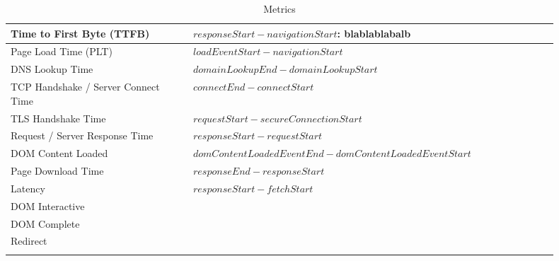 

\begin{center}
	\small
	\begin{longtable}{ | p{0.3\linewidth} | p{0.6\linewidth} | }
	\hline
	Time to First Byte (TTFB) & $responseStart - navigationStart$: blablablabalb \\
	\hline
	Page Load Time (PLT) & $loadEventStart - navigationStart$ \\
	\hline
	DNS Lookup Time & $domainLookupEnd - domainLookupStart$ \\
	\hline
	TCP Handshake / Server Connect Time & $connectEnd - connectStart$ \\
	\hline
	TLS Handshake Time & $requestStart - secureConnectionStart$ \\
	\hline
	Request / Server Response Time & $responseStart - requestStart$ \\
	\hline
	DOM Content Loaded & $domContentLoadedEventEnd - domContentLoadedEventStart$ \\
	\hline
	Page Download Time & $responseEnd - responseStart$ \\
	\hline
	Latency & $responseStart - fetchStart$ \\
	\hline
	DOM Interactive & \\
	\hline
	DOM Complete & \\
	\hline
	Redirect & \\
	\hline
	\caption{Metrics} %
	\label{tab:navigationtiming_metrics}
	\end{longtable}
\end{center}












